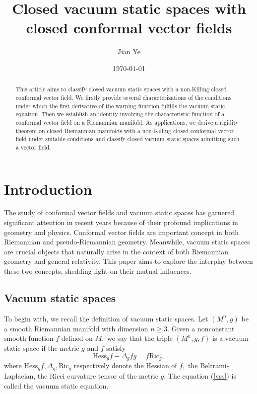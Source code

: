 \documentclass[10pt,leqno,oneside]{amsart}
\title{Closed vacuum static spaces with closed conformal vector fields}
\author{Jian Ye}
\date{\today}
\begin{document}
\let\thefootnote\relax
{}

\maketitle

 \begin{abstract}
       This article aims to classify closed vacuum static spaces with a non-Killing closed conformal vector field. We firstly provide several characterizations of the conditions under which the first derivative of the warping function fulfills the vacuum static equation. Then we establish an identity involving the characteristic function of a conformal vector field on a Riemannian manifold. As applications, we derive a rigidity theorem on closed Riemannian manifolds with a non-Killing closed conformal vector field under suitable conditions and classify closed vacuum static spaces admitting such a vector field.
 \end{abstract}





\section{Introduction}



          The study of conformal vector fields and vacuum static spaces has garnered significant attention in recent years because of their profound implications in geometry and physics. Conformal vector fields are important concept in both Riemannian and pseudo-Riemannian geometry. Meanwhile, vacuum static spaces are crucial objects that naturally arise in the context of both Riemannian geometry and general relativity. This paper aims to explore the interplay between these two concepts, shedding light on their mutual influences.
   \subsection{Vacuum static spaces}
          To begin with, we recall the definition of vacuum static spaces. Let $(M^n, g)$ be a smooth Riemannian manifold with dimension $n\ge3.$ Given a nonconstant smooth function $f$ defined on $M,$ we say that the triple $(M^n,g, f)$ is a vacuum static space if the metric $g$ and $f$ satisfy
          \begin{equation}\label{vss}
                \text{Hess}_{g}f-\Delta_{g} fg=f\text{Ric}_{g},
            \end{equation}
          where $\text{Hess}_{g}f,\Delta_{g},\text{Ric}_{g}$ respectively denote the Hessian of $f,$ the Beltrami-Laplacian, the Ricci curvature tensor of the metric $g$. The equation (\ref{vss}) is called the vacuum static equation.
\end{document}
